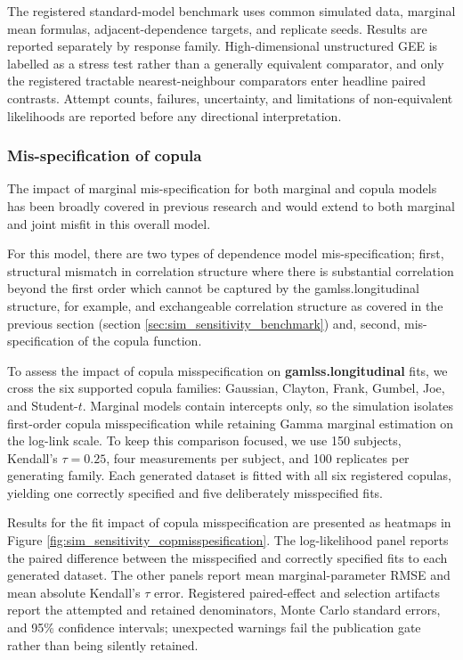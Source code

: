 \documentclass{article}
\newcommand{\pkg}{\textbf}
\begin{document}
The registered standard-model benchmark uses common simulated data, marginal
mean formulas, adjacent-dependence targets, and replicate seeds. Results are
reported separately by response family.  High-dimensional unstructured GEE is
labelled as a stress test rather than a generally equivalent comparator, and
only the registered tractable nearest-neighbour comparators enter headline
paired contrasts.  Attempt counts, failures, uncertainty, and limitations of
non-equivalent likelihoods are reported before any directional interpretation.

\subsubsection{Mis-specification of copula} \label{sec:sim_sensitivity_copula}

The impact of marginal mis-specification for both marginal and copula models has been broadly covered in previous research and would extend to both marginal and joint misfit in this overall model. 

For this model, there are two types of dependence model mis-specification; first, structural mismatch in correlation structure where there is substantial correlation beyond the first order which cannot be captured by the gamlss.longitudinal structure, for example, and exchangeable correlation structure as covered in the previous section (section \ref{sec:sim_sensitivity_benchmark}) and, second, mis-specification of the copula function. 

To assess the impact of copula misspecification on \pkg{gamlss.longitudinal} fits, we cross the six supported copula families: Gaussian, Clayton, Frank, Gumbel, Joe, and Student-$t$. Marginal models contain intercepts only, so the simulation isolates first-order copula misspecification while retaining Gamma marginal estimation on the log-link scale. To keep this comparison focused, we use 150 subjects, Kendall's $\tau=0.25$, four measurements per subject, and 100 replicates per generating family. Each generated dataset is fitted with all six registered copulas, yielding one correctly specified and five deliberately misspecified fits.

Results for the fit impact of copula misspecification are presented as heatmaps in Figure \ref{fig:sim_sensitivity_copmisspesification}. The log-likelihood panel reports the paired difference between the misspecified and correctly specified fits to each generated dataset. The other panels report mean marginal-parameter RMSE and mean absolute Kendall's $\tau$ error. Registered paired-effect and selection artifacts report the attempted and retained denominators, Monte Carlo standard errors, and 95\% confidence intervals; unexpected warnings fail the publication gate rather than being silently retained.
\end{document}
